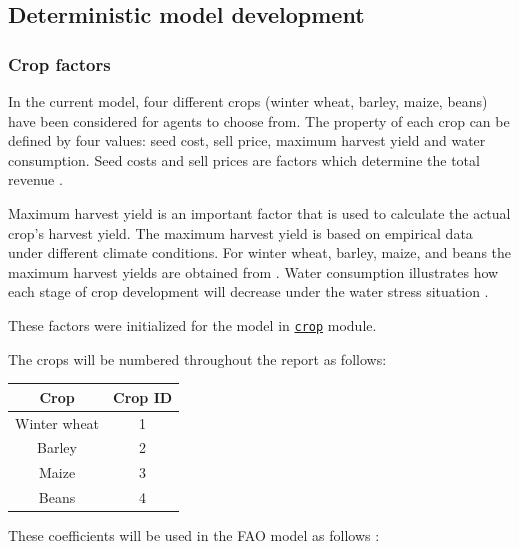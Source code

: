 \documentclass[a4paper,12pt]{article} %
\begin{document}
\subsection{Deterministic model development}

\subsubsection{Crop factors}
In the current model, four different crops (winter wheat, barley, maize, beans) have been considered for agents to choose from. 
The property of each crop can be defined by four values: seed cost, sell price, maximum harvest yield and water consumption. Seed costs and sell prices are factors which determine the total revenue \cite{Jose}. 


Maximum harvest yield is an important factor that is used to calculate the actual crop’s harvest yield.  The maximum harvest yield is based on empirical data under different climate conditions. For winter wheat, barley, maize, and beans the maximum harvest yields are obtained from \cite{w9030157}. Water consumption illustrates how each stage of crop development will decrease under the water stress situation \cite{VAUX198361}.

These factors were initialized for the model in \href{https://n.ethz.ch/~cgolling/gess/html/code/crops.html}{\texttt{crop}} module.

The crops will be numbered throughout the report as follows:
\begin{center}
\begin{tabular}{ ||c|c|| } 
\hline
Crop & Crop ID  \\
\hline
Winter wheat & 1\\
Barley & 2 \\
Maize & 3 \\
Beans & 4 \\
\hline
\end{tabular}
\end{center}


These coefficients will be used in the FAO model \cite{allenFAO24Reference1991} as follows :
\end{document}

